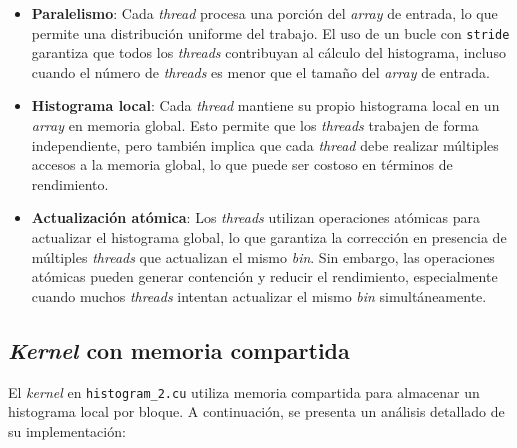             \begin{itemize}
            
                \item \textbf{Paralelismo}: Cada \textit{thread} procesa una porción del \textit{array} de entrada, lo que permite una distribución uniforme del trabajo. El uso de un bucle con \texttt{stride} garantiza que todos los \textit{threads} contribuyan al cálculo del histograma, incluso cuando el número de \textit{threads} es menor que el tamaño del \textit{array} de entrada.
                
                \item \textbf{Histograma local}: Cada \textit{thread} mantiene su propio histograma local en un \textit{array} en memoria global. Esto permite que los \textit{threads} trabajen de forma independiente, pero también implica que cada \textit{thread} debe realizar múltiples accesos a la memoria global, lo que puede ser costoso en términos de rendimiento.
                
                \item \textbf{Actualización atómica}: Los \textit{threads} utilizan operaciones atómicas para actualizar el histograma global, lo que garantiza la corrección en presencia de múltiples \textit{threads} que actualizan el mismo \textit{bin}. Sin embargo, las operaciones atómicas pueden generar contención y reducir el rendimiento, especialmente cuando muchos \textit{threads} intentan actualizar el mismo \textit{bin} simultáneamente.
                
            \end{itemize}

    \subsection{\textit{Kernel} con memoria compartida}

        El \textit{kernel} en \texttt{histogram\_2.cu} utiliza memoria compartida para almacenar un histograma local por bloque. A continuación, se presenta un análisis detallado de su implementación:
        

